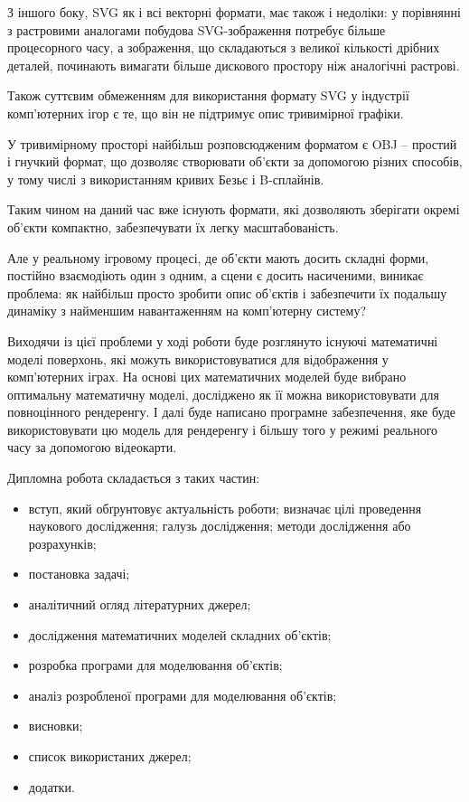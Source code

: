\let\mypdfximage\pdfximage\def\pdfximage{\immediate\mypdfximage}\documentclass[14pt,a4paper]{extarticle}
\theoremstyle{definition}
\renewcommand{\[}{\begin{singlespace}\begin{equation*}}
\renewcommand{\]}{\end{equation*}\end{singlespace}}
\renewcommand{\+}{\discretionary{\mbox{\scriptsize$\hookleftarrow$}}{}{}}
\begin{document}
З іншого боку, SVG як і всі векторні формати, має також і недоліки: у порівнянні з растровими аналогами побудова SVG-зображення потребує більше процесорного часу, а зображення, що складаються з великої кількості дрібних деталей, починають вимагати більше дискового простору ніж аналогічні растрові. 

Також суттєвим обмеженням для використання формату SVG у індустрії комп'ютерних ігор є те, що він не підтримує опис тривимірної графіки.

У тривимірному просторі найбільш розповсюдженим форматом є OBJ – простий і гнучкий формат, що дозволяє створювати об'єкти за допомогою різних способів, у тому числі з використанням кривих Безьє і B-сплайнів.
 
Таким чином на даний час вже існують формати, які дозволяють зберігати окремі об'єкти компактно, забезпечувати їх легку масштабованість.

Але у реальному ігровому процесі, де об'єкти мають досить складні форми, постійно взаємодіють один з одним, а сцени є досить насиченими, виникає проблема: як найбільш просто зробити опис об'єктів і забезпечити їх подальшу динаміку з найменшим навантаженням на комп'ютерну систему?

Виходячи із цієї проблеми у ході роботи буде розглянуто існуючі математичні моделі поверхонь, які можуть використовуватися для відображення у комп'ютерних іграх. На основі цих математичних моделей буде вибрано оптимальну математичну моделі, досліджено як її можна використовувати для повноцінного рендеренгу. І далі буде написано програмне забезпечення, яке буде використовувати цю модель для рендеренгу і більшу того у режимі реального часу за допомогою відеокарти.

Дипломна робота складається з таких частин:

\begin{itemize}
\item вступ, який обґрунтовує актуальність роботи; визначає цілі проведення наукового дослідження; галузь дослідження; методи дослідження або розрахунків;
\item постановка задачі;
\item аналітичний огляд літературних джерел;
\item дослідження математичних моделей складних об'єктів;
\item розробка програми для моделювання об'єктів;
\item аналіз розробленої програми для моделювання об'єктів;
\item висновки;
\item список використаних джерел;
\item додатки. 
\end{itemize}
\end{document}
